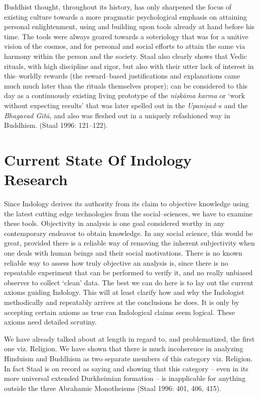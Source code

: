 Buddhist thought, throughout its history, has only sharpened the focus of existing culture towards a more pragmatic psychological emphasis on attaining personal enlightenment, using and building upon tools already at hand before his time. The tools were always geared towards a soteriology that was for a unitive vision of the cosmos, and for personal and social efforts to attain the same via harmony within the person and the society. Staal also clearly shows that Vedic rituals, with high discipline and rigor, but also with their utter lack of interest in this–worldly rewards (the reward–based justifications and explanations came much much later than the rituals themselves proper); can be considered to this day as a continuously existing living prototype of the \textit{niṣkāma karma} or ‘work without expecting results’ that was later spelled out in the \textit{Upaniṣad}–s and the \textit{Bhagavad Gītā}, and also was fleshed out in a uniquely refashioned way in Buddhism. (Staal 1996: 121–122).


\section*{Current State Of Indology Research}

Since Indology derives its authority from its claim to objective knowledge using the latest cutting edge technologies from the social–sciences, we have to examine these tools. Objectivity in analysis is one goal considered worthy in any contemporary endeavor to obtain knowledge. In any social science, this would be great, provided there is a reliable way of removing the inherent subjectivity when one deals with human beings and their social motivations. There is no known reliable way to assess how truly objective an analysis is, since there is no repeatable experiment that can be performed to verify it, and no really unbiased observer to collect ‘clean’ data. The best we can do here is to lay out the current axioms guiding Indology. This will at least clarify how and why the Indologist methodically and repeatably arrives at the conclusions he does. It is only by accepting certain axioms as true can Indological claims seem logical. These axioms need detailed scrutiny.

We have already talked about at length in regard to, and problematized, the first one viz. Religion. We have shown that there is much incoherence in analyzing Hinduism and Buddhism as two separate members of this category viz. Religion. In fact Staal is on record as saying and showing that this category – even in its more universal extended Durkheimian formation – is inapplicable for anything outside the three Abrahamic Monotheisms (Staal 1996: 401, 406, 415).

